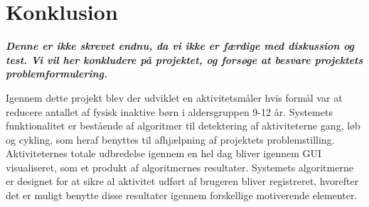 \section{Konklusion}
\textbf{\textit{Denne er ikke skrevet endnu, da vi ikke er færdige med diskussion og test. Vi vil her konkludere på projektet, og forsøge at besvare projektets problemformulering.}}


Igennem dette projekt blev der udviklet en aktivitetsmåler hvis formål var at reducere antallet af fysisk inaktive børn i aldersgruppen 9-12 år. Systemets funktionalitet er bestående af algoritmer til detektering af aktiviteterne gang, løb og cykling, som heraf benyttes til afhjælpning af projektets problemstilling. Aktiviteternes totale udbredelse igennem en hel dag bliver igennem GUI visualiseret, som et produkt af algoritmernes resultater. Systemets algoritmerne er designet for at sikre al aktivitet udført af brugeren bliver registreret, hvorefter det er muligt benytte disse resultater igennem forskellige motiverende elementer. 



